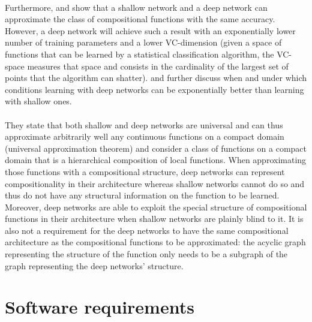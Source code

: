 \documentclass[a4paper]{article}
\begin{document}
\paragraph{}Furthermore, \citep{Mhaskar2016} and \citep{Mhaskar2016May} show that a shallow network and a deep network can approximate the class of compositional functions with the same accuracy. However, a deep network will achieve such a result with an exponentially lower number of training parameters and a lower VC-dimension (given a space of functions that can be learned by a statistical classification algorithm, the VC-space measures that space and consists in the cardinality of the largest set of points that the algorithm can shatter). %
\citep{Poggio2017} and \citep{Mhaskar17} further discuss when and under which conditions learning with deep networks can be exponentially better than learning with shallow ones. 

\paragraph{}They state that both shallow and deep networks are universal and can thus approximate arbitrarily well any continuous functions on a compact domain (universal approximation theorem) and consider a class of functions on a compact domain that is a hierarchical composition of local functions. When approximating those functions with a compositional structure, deep networks can represent compositionality in their architecture whereas shallow networks cannot do so and thus do not have any structural information on the function to be learned. Moreover, deep networks are able to exploit the special structure of compositional functions in their architecture when shallow networks are plainly blind to it. It is also not a requirement for the deep networks to have the same compositional architecture as the compositional functions to be approximated: the acyclic graph representing the structure of the function only needs to be a subgraph of the graph representing the deep networks' structure.

\section{Software requirements}
\end{document}
